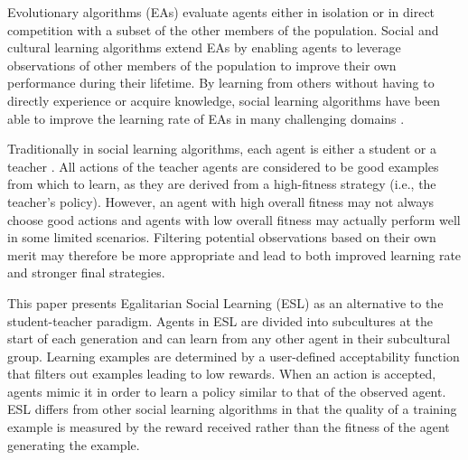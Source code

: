 \documentclass{sig-alternate}
\begin{document}
Evolutionary algorithms (EAs) \cite{fogel1966artificial} evaluate agents either in isolation or in direct competition with a subset of the other members of the population. Social and cultural learning algorithms \cite{reynolds1994introduction} extend EAs by enabling agents to leverage observations of other members of the population to improve their own performance during their lifetime. By learning from others without having to directly experience or acquire knowledge, social learning algorithms have been able to improve the learning rate of EAs in many challenging domains \cite{denaro1996cultural, reynolds1994introduction, haasdijk2008social, onwubolu2004new, ku2000study, vogt2010modeling, acerbi2007social, de2011incremental}.

Traditionally in social learning algorithms, each agent is either a student or a teacher \cite{parisi1997cultural, acerbi2006cultural}. All actions of the teacher agents are considered to be good examples from which to learn, as they are derived from a high-fitness strategy (i.e., the teacher's policy). However, an agent with high overall fitness may not always choose good actions and agents with low overall fitness may actually perform well in some limited scenarios. Filtering potential observations based on their own merit may therefore be more appropriate and lead to both improved learning rate and stronger final strategies.

This paper presents Egalitarian Social Learning (ESL) as an alternative to the student-teacher paradigm. Agents in ESL are divided into subcultures at the start of each generation and can learn from any other agent in their subcultural group. Learning examples are determined by a user-defined acceptability function that filters out examples leading to low rewards. When an action is accepted, agents mimic it in order to learn a policy similar to that of the observed agent. ESL differs from other social learning algorithms in that the quality of a training example is measured by the reward received rather than the fitness of the agent generating the example.

\end{document}
